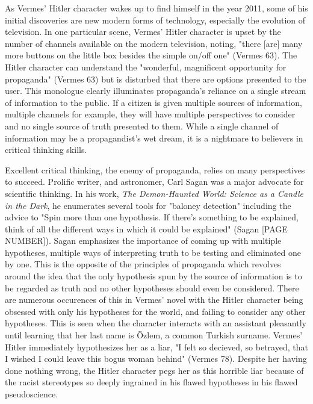 \documentclass[12pt]{article}
\begin{document}
As Vermes' Hitler character wakes up to find himself in the year 2011, some of his initial discoveries are
new modern forms of technology, especially the evolution of television. In one particular scene,
Vermes' Hitler character is upset by the number of channels available on the modern television, 
noting, "there [are] many more buttons on the little box besides the simple on/off one" (Vermes 63).
The Hitler character can understand the "wonderful, magnificent opportunity for propaganda" (Vermes 63) but
is disturbed that there are options presented to the user. This monologue clearly illuminates propaganda's 
reliance on a single stream of information to the public. If a citizen is given multiple sources of information,
multiple channels for example, they will have multiple perspectives to consider and no single source of truth
presented to them. While a single channel of information may be a propagandist's wet dream, it is a nightmare to
believers in critical thinking skills.

Excellent critical thinking, the enemy of propaganda, relies on many perspectives to succeed. Prolific writer, and
astronomer, Carl Sagan was a major advocate for scientific thinking. In his work,
\textit{The Demon-Haunted World: Science as a Candle in the Dark},
he enumerates several tools for "baloney detection" including the advice to
"Spin more than one hypothesis. If there’s something to be explained, 
think of all the different ways in which it could be explained" (Sagan [PAGE NUMBER]).
Sagan emphasizes the importance of coming up with multiple hypotheses, multiple ways of 
interpreting truth to be testing and eliminated one by one. This is the opposite of the principles of propaganda
which revolves around the idea that the only hypothesis spun by the source of information is to be regarded
as truth and no other hypotheses should even be considered. There are numerous occurences of this in Vermes'
novel with the Hitler character being obsessed with only his hypotheses for the world, and failing to consider any
other hypotheses. This is seen when the character interacts with an assistant pleasantly until learning
that her last name is Özlem, a common Turkish surname. Vermes' Hitler immediately hypothesizes her as a liar,
"I felt so decieved, so betrayed, that I wished I could leave this bogus woman behind" (Vermes 78).
Despite her having done nothing wrong, the Hitler character pegs her as this horrible liar because of the
racist stereotypes so deeply ingrained in his flawed hypotheses in his flawed pseudoscience.
\end{document}
